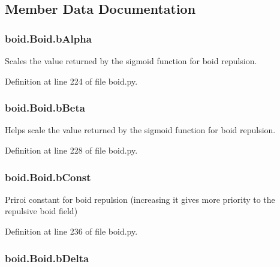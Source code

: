\subsection{Member Data Documentation}
\hypertarget{classboid_1_1Boid_abc7224afe02b42ee1c32ecd15d1b0a22}{
\subsubsection[{b\-Alpha}]{\setlength{\rightskip}{0pt plus 5cm}boid.\-Boid.\-b\-Alpha}}\label{classboid_1_1Boid_abc7224afe02b42ee1c32ecd15d1b0a22}


Scales the value returned by the sigmoid function for boid repulsion. 



Definition at line 224 of file boid.\-py.

\hypertarget{classboid_1_1Boid_a1a48be012c505eea2e1b9f110d9bd5f3}{
\subsubsection[{b\-Beta}]{\setlength{\rightskip}{0pt plus 5cm}boid.\-Boid.\-b\-Beta}}\label{classboid_1_1Boid_a1a48be012c505eea2e1b9f110d9bd5f3}


Helps scale the value returned by the sigmoid function for boid repulsion. 



Definition at line 228 of file boid.\-py.

\hypertarget{classboid_1_1Boid_a868b1d8e6fadd2b1beedc1a9f23edde5}{
\subsubsection[{b\-Const}]{\setlength{\rightskip}{0pt plus 5cm}boid.\-Boid.\-b\-Const}}\label{classboid_1_1Boid_a868b1d8e6fadd2b1beedc1a9f23edde5}


Priroi constant for boid repulsion (increasing it gives more priority to the repulsive boid field) 



Definition at line 236 of file boid.\-py.

\hypertarget{classboid_1_1Boid_afebd87123c129406ee9e8c99f85f66a7}{
\subsubsection[{b\-Delta}]{\setlength{\rightskip}{0pt plus 5cm}boid.\-Boid.\-b\-Delta}}\label{classboid_1_1Boid_afebd87123c129406ee9e8c99f85f66a7}


